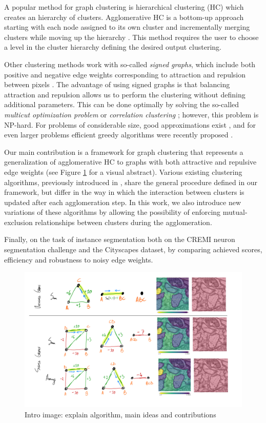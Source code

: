 A popular method for graph clustering is hierarchical clustering (HC) which creates an hierarchy of clusters. Agglomerative HC is a bottom-up approach starting with each node assigned to its own cluster and incrementally merging clusters while moving up the hierarchy \cite{lance1967general}. This method requires the user to choose a level in the cluster hierarchy defining the desired output clustering. 

Other clustering methods work with so-called \emph{signed graphs}, which include both positive and negative edge weights corresponding to attraction and repulsion between pixels . The advantage of using signed graphs is that balancing attraction and repulsion allows us to perform the clustering without defining additional parameters. This can be done optimally by solving the so-called \emph{multicut optimization problem} or \emph{correlation clustering} \cite{kappes2011globally,chopra1991multiway}; however, this problem is NP-hard. For problems of considerable size, good approximations exist \cite{yarkony2012fast,pape2017solving}, and for even larger problems efficient greedy algorithms were recently proposed \cite{levinkov2017comparative,wolf2018mutex}.

Our main contribution is a framework for graph clustering that represents a generalization of agglomerative HC to graphs with both attractive and repulsive edge weights (see Figure \ref{fig:intro_figure} for a visual abstract). 
Various existing clustering algorithms, previously introduced in \cite{levinkov2017comparative,wolf2018mutex,lance1967general}, share the general procedure defined in our framework, but differ in the way in which the interaction between clusters is updated after each agglomeration step. In this work, we also introduce new variations of these algorithms by allowing the possibility of enforcing mutual-exclusion relationships between clusters during the agglomeration.  

Finally,  on the task of instance segmentation both on the CREMI neuron segmentation challenge and the Cityscapes dataset, by comparing achieved scores, efficiency and robustness to noisy edge weights.





\begin{figure}[t]
\centering
\includegraphics[width=\textwidth,trim=0.4in 1.2in 0.in 0.05in,clip]{./figs/intro_image.jpg} %
\caption{\small 
Intro image: explain algorithm, main ideas and contributions
\label{fig:intro_figure}}
\end{figure}
